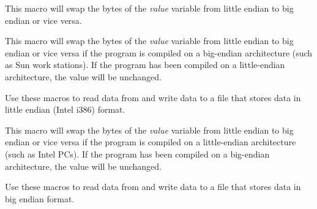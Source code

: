 


This macro will swap the bytes of the {\it value} variable from little
endian to big endian or vice versa.

\label{intswaponbe}





This macro will swap the bytes of the {\it value} variable from little
endian to big endian or vice versa if the program is compiled on a
big-endian architecture (such as Sun work stations). If the program has 
been compiled on a little-endian architecture, the value will be unchanged.

Use these macros to read data from and write data to a file that stores 
data in little endian (Intel i386) format.

\label{intswaponle}





This macro will swap the bytes of the {\it value} variable from little
endian to big endian or vice versa if the program is compiled on a
little-endian architecture (such as Intel PCs). If the program has 
been compiled on a big-endian architecture, the value will be unchanged.

Use these macros to read data from and write data to a file that stores 
data in big endian format.

\label{classinfo}


